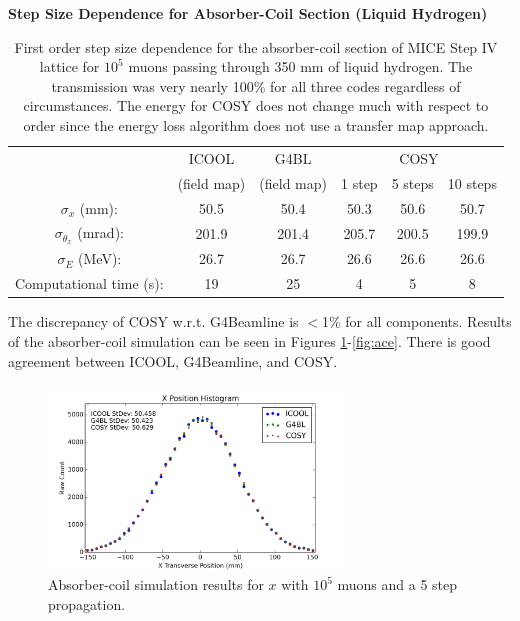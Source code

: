 \begin{table}
\caption*{\textbf{Step Size Dependence for Absorber-Coil Section (Liquid Hydrogen)}}
\begin{center}
\begin{tabularx}{\textwidth}{cccccc}
\hline \hline
& ICOOL & G4BL & \multicolumn{3}{c}{\sout{\hspace{1.5cm}} COSY \sout{\hspace{1.5cm}}}\\
& (field map) & (field map) & 1 step & 5 steps & 10 steps\\
\hline
$\sigma_x$ (mm): & 50.5 & 50.4 & 50.3 & 50.6 & 50.7\\
$\sigma_{\theta_x}$ (mrad): & 201.9 & 201.4 & 205.7 & 200.5 & 199.9\\
$\sigma_E$ (MeV): & 26.7 & 26.7 & 26.6 & 26.6 & 26.6\\
Computational time (s): & 19 & 25 & 4 & 5 & 8\\
\hline
\end{tabularx}
\end{center}
\caption[Step size dependence for the absorber-coil section of MICE Step IV lattice for liquid hydrogen.]{First order step size dependence for the absorber-coil section of MICE Step IV lattice for $10^5$ muons passing through 350 mm of liquid hydrogen. The transmission was very nearly 100\% for all three codes regardless of circumstances. The energy for COSY does not change much with respect to order since the energy loss algorithm does not use a transfer map approach.}
\label{tbl:mice_step_size_ac}
\end{table}

The discrepancy of COSY w.r.t. G4Beamline is $<$1\% for all components. Results of the absorber-coil simulation can be seen in Figures \ref{fig:acx}-\ref{fig:ace}. There is good agreement between ICOOL, G4Beamline, and COSY.

\begin{figure}[H]
  \centering
    \includegraphics[width=0.7\textwidth]{MICE data/absorber coils/x} 
  \caption{Absorber-coil simulation results for $x$ with $10^5$ muons and a 5 step propagation.}
  \label{fig:acx}
\end{figure}

